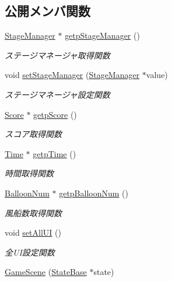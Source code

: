 \subsection*{公開メンバ関数}
\begin{DoxyCompactItemize}
\item 
\mbox{\hyperlink{class_stage_manager}{Stage\+Manager}} $\ast$ \mbox{\hyperlink{class_game_scene_adbeafbb5e7029a875c7471d9792e5862}{getp\+Stage\+Manager}} ()
\begin{DoxyCompactList}\small\item\em ステージマネージャ取得関数 \end{DoxyCompactList}\item 
void \mbox{\hyperlink{class_game_scene_a22d5ace2b0834672d2a3d4044cda8b8e}{set\+Stage\+Manager}} (\mbox{\hyperlink{class_stage_manager}{Stage\+Manager}} $\ast$value)
\begin{DoxyCompactList}\small\item\em ステージマネージャ設定関数 \end{DoxyCompactList}\item 
\mbox{\hyperlink{class_score}{Score}} $\ast$ \mbox{\hyperlink{class_game_scene_adaeb9248bb4825eb4c80b3b75032fb91}{getp\+Score}} ()
\begin{DoxyCompactList}\small\item\em スコア取得関数 \end{DoxyCompactList}\item 
\mbox{\hyperlink{class_time}{Time}} $\ast$ \mbox{\hyperlink{class_game_scene_a8f489cb8ef215a3df4806444aa69e869}{getp\+Time}} ()
\begin{DoxyCompactList}\small\item\em 時間取得関数 \end{DoxyCompactList}\item 
\mbox{\hyperlink{class_balloon_num}{Balloon\+Num}} $\ast$ \mbox{\hyperlink{class_game_scene_a873a5361d2169acbc94298f200d45259}{getp\+Balloon\+Num}} ()
\begin{DoxyCompactList}\small\item\em 風船数取得関数 \end{DoxyCompactList}\item 
void \mbox{\hyperlink{class_game_scene_a91e9e6ce0d780a1a673a79176069634b}{set\+All\+UI}} ()
\begin{DoxyCompactList}\small\item\em 全\+U\+I設定関数 \end{DoxyCompactList}\item 
\mbox{\hyperlink{class_game_scene_a25e9e82ce85255dac27cd6489751bd40}{Game\+Scene}} (\mbox{\hyperlink{class_scene_base_1_1_state_base}{State\+Base}} $\ast$state)

\end{DoxyCompactItemize}
